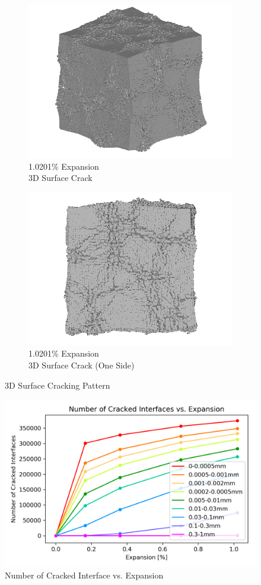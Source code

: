 \begin{figure}[ht!]
    \begin{subfigure}{.5\textwidth}
      \centering
      \includegraphics[width=0.5\linewidth]{Files/exp_3D/ASR/A30P25_4_3d.png}
      \caption{1.0201\% Expansion\\3D Surface Crack}
    \end{subfigure}%
    \begin{subfigure}{.5\textwidth}
      \centering
      \includegraphics[width=0.5\linewidth]{Files/exp_3D/ASR/A30P25_4_3ds.png}
      \caption{1.0201\% Expansion\\3D Surface Crack (One Side)}
    \end{subfigure}%

\caption{3D Surface Cracking Pattern}
\label{fig:A30_3Dcrack}
\end{figure}

\begin{figure}[ht!]
\centering
\includegraphics[width=.8\linewidth]{Files/interface/A30P25CRACK.png}
  \caption{Number of Cracked Interface vs. Expansion}
  \label{A30P25CRACK}
\end{figure}

